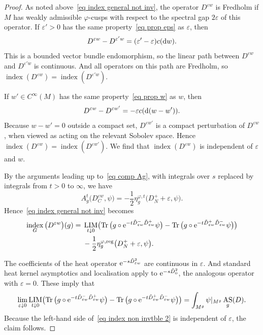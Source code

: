 \documentclass[10pt,a4paper]{amsart}
\numberwithin{equation}{section}
\DeclareMathOperator{\Tr}{Tr}
\DeclareMathOperator{\AS}{AS}
\DeclareMathOperator{\ind}{index}
\DeclareMathOperator{\reg}{reg}
\DeclareMathOperator{\LIM}{LIM}
\begin{document}
\begin{proof}
As noted above~\eqref{eq index general not inv}, the operator $D^{\varepsilon w}$ is Fredholm if $M$ has weakly admissible $\varphi$-cusps with respect to the spectral gap $2\varepsilon$ of this operator.
If $\varepsilon'>0$ has the same property~\eqref{eq prop eps} as $\varepsilon$, then
\[
D^{\varepsilon w} - D^{\varepsilon' w} = (\varepsilon' - \varepsilon)c({\rm d}w).
\]
This is a bounded vector bundle endomorphism, so the linear path between $D^{\varepsilon w}$ and $D^{\varepsilon' w}$ is continuous. And all operators on this path are Fredholm, so $\ind(D^{\varepsilon w}) =\ind(D^{\varepsilon' w})$.

If $w' \in C^{\infty}(M)$ has the same property~\eqref{eq prop w} as $w$, then
\[
D^{\varepsilon w} - D^{\varepsilon w'} = - \varepsilon c({\rm d}(w-w')).
\]
Because $w-w' = 0$ outside a compact set, $D^{\varepsilon w'}$ is a compact perturbation of $D^{\varepsilon w}$, when viewed as acting on the relevant Sobolev space. Hence $\ind(D^{\varepsilon w}) =\ind(D^{\varepsilon w'})$. We find that $\ind(D^{\varepsilon w})$ is independent of $\varepsilon$ and $w$.

By the arguments leading up to~\eqref{eq comp Ag}, with integrals over $s$ replaced by integrals from $t>0$ to $\infty$, we have
\[
A_{g}^t\big(D_C^{\varepsilon w}, \psi\big) = -\frac{1}{2}\eta_g^{\varphi, t}\big(D_N^+ + \varepsilon, \psi\big).
\]
Hence~\eqref{eq index general not inv} becomes
\begin{align}
 \ind_G\big(D^{\varepsilon w}\big)(g) ={}& \LIM_{t\downarrow 0} \bigl(
 \Tr\big(g\circ {\rm e}^{-t\tilde D^-_{\varepsilon w} \tilde D^+_{\varepsilon w}}\psi\big) - \Tr\big(g\circ {\rm e}^{-t\tilde D^+_{\varepsilon w} \tilde D^-_{\varepsilon w}}\psi\big) \bigr) \nonumber
 \\
 &-\frac{1}{2}\eta_g^{\varphi, \reg}\big(D_N^+ + \varepsilon, \psi\big).
\label{eq index non invtble 2}
\end{align}

The coefficients of the heat operator ${\rm e}^{-s \tilde D_{\varepsilon w}^2}$ are continuous in $\varepsilon$. And standard heat kernel asymptotics and localisation apply to ${\rm e}^{-s \tilde D_0^2}$, the analogous operator with $\varepsilon = 0$. These imply that
\[
\lim_{\varepsilon \downarrow 0} \LIM_{t\downarrow 0} \bigl(
 \Tr\big(g\circ {\rm e}^{-t\tilde D^-_{\varepsilon w} \tilde D^+_{\varepsilon w}}\psi\big) - \Tr\big(g\circ {\rm e}^{-t\tilde D^+_{\varepsilon w} \tilde D^-_{\varepsilon w}}\psi\big) \bigr) = \int_{M^g} \psi|_{M^g} \AS_g(D).
\]
Because the left-hand side of~\eqref{eq index non invtble 2} is independent of $\varepsilon$, the claim follows.
\end{proof}
\end{document}
